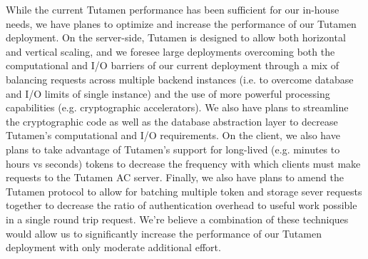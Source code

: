 While the current Tutamen performance has been sufficient for our
in-house needs, we have planes to optimize and increase the
performance of our Tutamen deployment. On the server-side, Tutamen is
designed to allow both horizontal and vertical scaling, and we foresee
large deployments overcoming both the computational and I/O barriers
of our current deployment through a mix of balancing requests across
multiple backend instances (i.e. to overcome database and I/O limits
of single instance) and the use of more powerful processing
capabilities (e.g. cryptographic accelerators). We also have plans to
streamline the cryptographic code as well as the database abstraction
layer to decrease Tutamen's computational and I/O requirements. On the
client, we also have plans to take advantage of Tutamen's support for
long-lived (e.g. minutes to hours vs seconds) tokens to decrease the
frequency with which clients must make requests to the Tutamen AC
server. Finally, we also have plans to amend the Tutamen protocol to
allow for batching multiple token and storage sever requests together
to decrease the ratio of authentication overhead to useful work
possible in a single round trip request. We're believe a combination
of these techniques would allow us to significantly increase the
performance of our Tutamen deployment with only moderate additional
effort.

